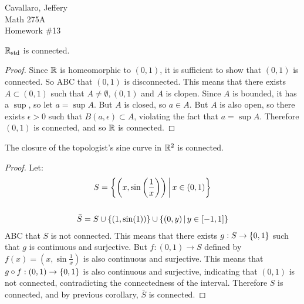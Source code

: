 \documentclass[letterpaper,12pt,fleqn]{article}
\newcommand{\e}{\epsilon}
\begin{document}
Cavallaro, Jeffery \\
Math 275A \\
Homework \#13

\bigskip

\begin{theorem}[8.3]
  \(\mathbb{R}_{\text{std}}\) is connected.
\end{theorem}

\begin{proof}
  Since \(\mathbb{R}\) is homeomorphic to \((0,1)\), it is sufficient to show that \((0,1)\) is connected.  So ABC that
  \((0,1)\) is disconnected.  This means that there exists \(A\subset(0,1)\) such that \(A\ne\emptyset,(0,1)\) and
  \(A\) is clopen.  Since \(A\) is bounded, it has a \(\sup\), so let \(a=\sup A\).  But \(A\) is closed, so
  \(a\in A\).  But \(A\) is also open, so there exists \(\e>0\) such that \(B(a,\e)\subset A\), violating the fact
  that \(a=\sup A\).  Therefore \((0,1)\) is connected, and so \(\mathbb{R}\) is connected.
\end{proof}

\begin{theorem}[Exercise 8.7]
  The closure of the topologist's sine curve in \(\mathbb{R}^2\) is connected.
\end{theorem}

\begin{proof}
  Let:
  \begin{gather*}
    S=\left\{{\left(x,\sin\left(\frac{1}{x}\right)\right)}\,\middle|\,{x\in(0,1)}\right\} \\
    \\
    \bar{S}=S\cup\{(1,\sin(1))\}\cup\left\{{(0,y)}\,\middle|\,{y\in[-1,1]}\right\}
  \end{gather*}
  ABC that \(S\) is not connected.  This means that there exists \(g:S\to\{0,1\}\) such that \(g\) is continuous
  and surjective.  But \(f:(0,1)\to S\) defined by \(f(x)=(x,\sin\frac{1}{x})\) is also continuous and surjective.
  This means that \(g\circ f:(0,1)\to\{0,1\}\) is also continuous and surjective, indicating that \((0,1)\)
  is not connected, contradicting the connectedness of the interval.  Therefore \(S\) is connected, and by
  previous corollary, \(\bar{S}\) is connected.
\end{proof}
\end{document}
